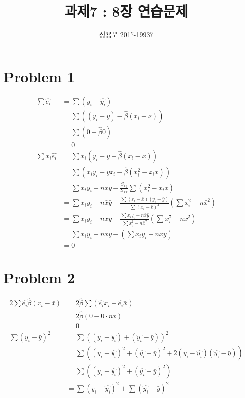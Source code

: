 \documentclass{article}
\title{과제7 : 8장 연습문제}
\author{성용운 2017-19937}
\date{}
\begin{document}
\maketitle

\section*{Problem 1}

\begin{align*}
	\sum \widehat{e_i}
	&= \sum (y_i - \widehat{y_i}) \\
	&= \sum \left(\left(y_i - \bar{y}\right) - \widehat{\beta}\left(x_i - \bar{x}\right)\right) \\
	&= \sum (0 - \widehat{\beta} 0) \\
	&= 0 \\
	\sum x_i \widehat{e_i}
	&= \sum x_i \left(y_i - \bar{y} - \widehat{\beta}\left(x_i - \bar{x}\right)\right) \\
	&= \sum \left(x_i y_i -\bar{y}  x_i - \widehat{\beta} \left(x_i^2 - x_i \bar{x}\right)\right) \\
	&= \sum x_i y_i - n\bar{x}\bar{y} - \frac{S_{xy}}{S_{xx}} \sum \left(x_i^2 - x_i \bar{x}\right) \\
	&= \sum x_i y_i - n\bar{x}\bar{y} - \frac{\sum (x_i - \bar{x})(y_i - \bar{y})}{\sum (x_i-\bar{x})^2} \left(\sum x_i^2 - n\bar{x}^2\right) \\
	&= \sum x_i y_i - n\bar{x}\bar{y} - \frac{\sum x_i y_i - n\bar{x}\bar{y}}{\sum x_i^2 -n \bar{x}^2}  \left(\sum x_i^2 - n\bar{x}^2\right) \\
	&= \sum x_i y_i - n\bar{x}\bar{y} - \left(\sum x_i y_i - n\bar{x}\bar{y}\right) \\
	&= 0
\end{align*}

\section*{Problem 2}

\begin{align*}
	2\sum \widehat{e_i} \widehat{\beta} (x_i - \bar{x})
	&= 2\widehat{\beta} \sum (\widehat{e_i} x_i - \widehat{e_i} \bar{x}) \\
	&= 2\widehat{\beta} (0 - 0 \cdot n \bar{x}) \\
	&= 0 \\
	\sum (y_i - \bar{y})^2
	&= \sum ((y_i - \widehat{y_i}) + (\widehat{y_i} - \bar{y}))^2 \\
	&= \sum \left(\left(y_i - \widehat{y_i}\right)^2 + \left(\widehat{y_i} - \bar{y}\right)^2 + 2\left(y_i - \widehat{y_i}\right)\left(\widehat{y_i} - \bar{y}\right)\right) \\
	&= \sum \left(\left(y_i - \widehat{y_i}\right)^2 + \left(\widehat{y_i} - \bar{y}\right)^2\right) \\
	&= \sum (y_i - \widehat{y_i})^2 + \sum (\widehat{y_i} - \bar{y})^2
\end{align*}
\end{document}
